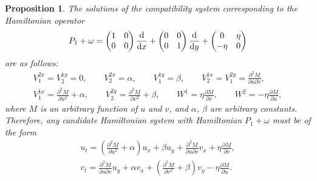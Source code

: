 \documentclass[pdftex]{sigma}
\numberwithin{equation}{section}
\newtheorem{Proposition}[Theorem]{Proposition}
 { \theoremstyle{definition}
\newtheorem{Definition}[Theorem]{Definition}
\newtheorem{Note}[Theorem]{Note}
\newtheorem{Example}[Theorem]{Example}
\newtheorem{Remark}[Theorem]{Remark} }
\begin{document}
\begin{Proposition}\label{proposition4.2}
The solutions of the compatibility system corresponding to the Hamiltonian operator
\begin{gather*}
P_1+\omega=\begin{pmatrix} 1&0\\0&0\\ \end{pmatrix} \frac{\rm d}{{\rm d}x}+\begin{pmatrix} 0&0\\0&1\\ \end{pmatrix} \frac{\rm d}{{\rm d}y}+\begin{pmatrix} 0&\eta\\-\eta&0\\ \end{pmatrix}
\end{gather*}
are as follows:
\begin{gather*}
V^{2x}_1=V^{1y}_2=0, \qquad V^{2x}_2=\alpha, \qquad V^{1y}_1=\beta,\qquad
V^{1x}_2=V^{2y}_1=\frac{\partial^2M}{\partial u\partial v}, \\ V^{1x}_1=\frac{\partial^2M}{\partial u^2}+\alpha, \qquad V^{2y}_2=\frac{\partial^2M}{\partial v^2}+\beta,\qquad
W^1=\eta\frac{\partial M}{\partial v}, \qquad W^2=-\eta\frac{\partial M}{\partial u},
\end{gather*}
where $M$ is an arbitrary function of $u$ and $v$, and $\alpha$, $\beta$ are arbitrary constants. Therefore, any candidate Hamiltonian system with Hamiltonian $P_1+\omega$ must be of the form
\begin{gather}
u_t=\left(\frac{\partial^2 M}{\partial u^2}+\alpha\right)u_x+\beta u_y+\frac{\partial^2 M}{\partial u\partial v}v_x+\eta\frac{\partial M}{\partial v},\nonumber\\
v_t=\frac{\partial^2 M}{\partial u\partial v}u_y+\alpha v_x+\left(\frac{\partial^2 M}{\partial v^2}+\beta\right)v_y-\eta\frac{\partial M}{\partial u}.\label{eq:solcomp1}
\end{gather}
\end{Proposition}
\end{document}
